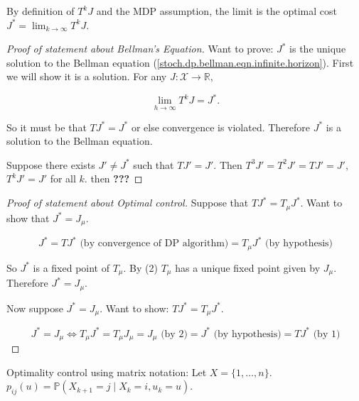 By definition of \(T^kJ\) and the MDP assumption, the limit is the optimal cost \(J^* = \lim_{k \to \infty} T^k J\).

\begin{proof}[Proof of statement about Bellman's Equation]

Want to prove: \(J^*\) is the unique solution to the Bellman equation (\ref{stoch.dp.bellman.eqn.infinite.horizon}). First we will show it is a solution. For any \(J: \mathcal{X} \to \mathbb{R}\),

\[
\lim_{h \to \infty} T^k J = J^*.
\]

So it must be that \(TJ^* = J^*\) or else convergence is violated. Therefore \(J^*\) is a solution to the Bellman equation. 

Suppose there exists \(J' \neq J^*\) such that \(TJ' = J'\). Then \(T^3 J' = T^2 J' = TJ' = J'\), \(T^k J' = J'\) for all \(k\). then \textbf{???}

\end{proof}

\begin{proof}[Proof of statement about Optimal control]

Suppose that \(TJ^* = T_\mu J^*\). Want to show that \(J^* = J_\mu\). 

\[
J^* = T J^* \text{ (by convergence of DP algorithm)} = T_\mu J^* \text{ (by hypothesis)}
\]

So \(J^*\) is a fixed point of \(T_\mu\). By (2) \(T_\mu\) has a unique fixed point given by \(J_\mu\). Therefore \(J^* = J_\mu\).

Now suppose \(J^* = J_\mu\). Want to show: \(TJ^* = T_\mu J^*\).

\[
J^* = J_\mu \iff T_\mu J^* = T_\mu J_\mu = J_\mu \text{ (by 2)} = J^* \text{ (by hypothesis)} = T J^* \text{ (by 1)}
\]

\end{proof}


Optimality control using matrix notation: Let \(X = \{1, \ldots, n\}\). \(p_{ij}(u) = \mathbb{P}(X_{k+1} = j \mid X_k = i, u_k = u)\).

